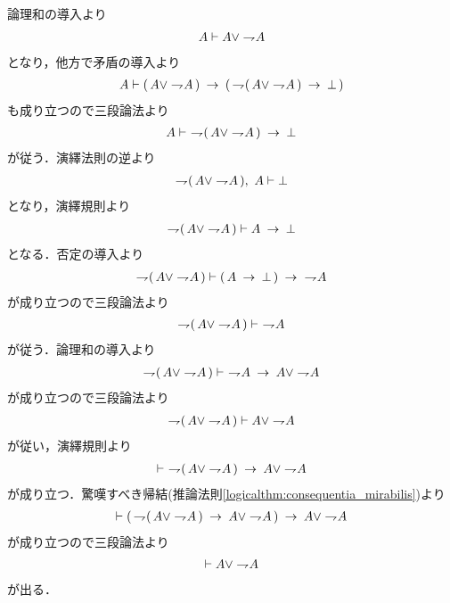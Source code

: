 	\begin{prf}
		論理和の導入より
		\begin{align}
			A \vdash A \vee \negation A
		\end{align}
		となり，他方で矛盾の導入より
		\begin{align}
			A \vdash (\, A \vee \negation A\, )
			\rarrow (\, \negation (\, A \vee \negation A\, ) \rarrow \bot\, )
		\end{align}
		も成り立つので三段論法より
		\begin{align}
			A \vdash\ \negation (\, A \vee \negation A\, ) \rarrow \bot
		\end{align}
		が従う．演繹法則の逆より
		\begin{align}
			\negation (\, A \vee \negation A\, ),\ A \vdash \bot
		\end{align}
		となり，演繹規則より
		\begin{align}
			\negation (\, A \vee \negation A\, ) \vdash A \rarrow \bot
		\end{align}
		となる．否定の導入より
		\begin{align}
			\negation (\, A \vee \negation A\, ) \vdash (\, A \rarrow \bot\, )
			\rarrow\ \negation A
		\end{align}
		が成り立つので三段論法より
		\begin{align}
			\negation (\, A \vee \negation A\, ) \vdash\ \negation A
		\end{align}
		が従う．論理和の導入より
		\begin{align}
			\negation (\, A \vee \negation A\, ) \vdash\ \negation A
			\rarrow A \vee \negation A
		\end{align}
		が成り立つので三段論法より
		\begin{align}
			\negation (\, A \vee \negation A\, ) \vdash A \vee \negation A
		\end{align}
		が従い，演繹規則より
		\begin{align}
			\vdash\ \negation (\, A \vee \negation A\, ) \rarrow A \vee \negation A
		\end{align}
		が成り立つ．驚嘆すべき帰結(推論法則\ref{logicalthm:consequentia_mirabilis})より
		\begin{align}
			\vdash
			(\, \negation (\, A \vee \negation A\, ) \rarrow A \vee \negation A\, )
			\rarrow A \vee \negation A
		\end{align}
		が成り立つので三段論法より
		\begin{align}
			\vdash A \vee \negation A
		\end{align}
		が出る．
		\QED
	\end{prf}
	
